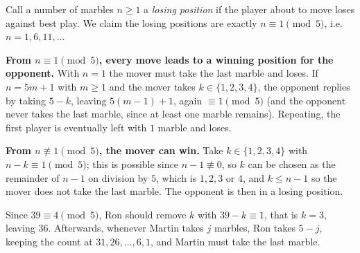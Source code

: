 Call a number of marbles $n\ge1$ a \emph{losing position} if the player about to move loses against best play. We claim the losing positions are exactly $n\equiv1\pmod5$, i.e. $n=1,6,11,\dots$

\textbf{From $n\equiv1\pmod 5$, every move leads to a winning position for the opponent.} With $n=1$ the mover must take the last marble and loses. If $n=5m+1$ with $m\ge1$ and the mover takes $k\in\{1,2,3,4\}$, the opponent replies by taking $5-k$, leaving $5(m-1)+1$, again $\equiv1\pmod5$ (and the opponent never takes the last marble, since at least one marble remains). Repeating, the first player is eventually left with $1$ marble and loses.

\textbf{From $n\not\equiv1\pmod5$, the mover can win.} Take $k\in\{1,2,3,4\}$ with $n-k\equiv1\pmod5$; this is possible since $n-1\not\equiv0$, so $k$ can be chosen as the remainder of $n-1$ on division by $5$, which is $1,2,3$ or $4$, and $k\le n-1$ so the mover does not take the last marble. The opponent is then in a losing position.

Since $39\equiv4\pmod5$, Ron should remove $k$ with $39-k\equiv1$, that is $k=\boxed{3}$, leaving $36$. Afterwards, whenever Martin takes $j$ marbles, Ron takes $5-j$, keeping the count at $31,26,\dots,6,1$, and Martin must take the last marble.

